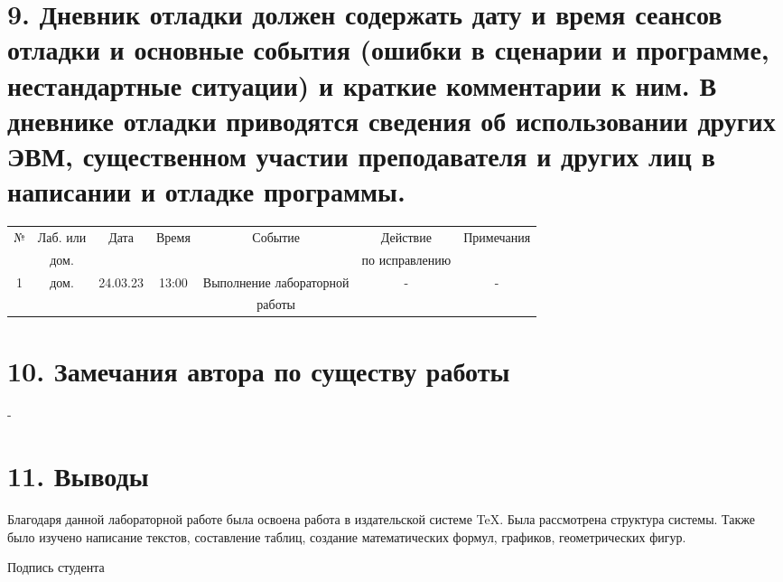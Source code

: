\documentclass[11pt]{report}
\begin{document}
\section*{9. Дневник отладки должен содержать дату и время сеансов отладки и основные события (ошибки в сценарии и программе, нестандартные ситуации) и краткие комментарии к ним. В дневнике отладки приводятся сведения об использовании других ЭВМ, существенном участии преподавателя и других лиц в написании и отладке программы.}

\begin{tabular}{|c|c|c|c|c|c|c|}
\hline
№ & Лаб. или & Дата & Время & Событие & Действие & Примечания\\ 
 & дом. & & & & по исправлению&\\
\hline
1 & дом. & 24.03.23 & 13:00 & Выполнение лабораторной & - & - \\
& & & & работы & & \\
\hline
\end{tabular}

\section*{10. Замечания автора по существу работы}
-

\section*{11. Выводы}
\hspace{10mm}
Благодаря данной лабораторной работе была освоена работа в издательской системе TeX. Была рассмотрена структура системы. Также было изучено написание текстов, составление таблиц, создание математических формул, графиков, геометрических фигур.

\vspace{10mm}
Подпись студента \underline{\hspace{3cm}}
\end{document}
